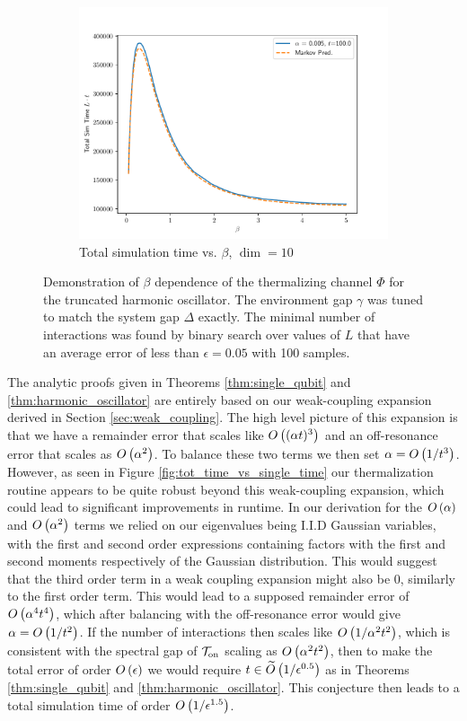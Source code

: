 \begin{figure}[t]
\begin{subfigure}{0.5\textwidth}
    \includegraphics[width=\textwidth]{tsp_numerics/data/sho_total_time_vs_beta_dim_10.pdf}
    \caption{Total simulation time vs. $\beta$, $\dim = 10$}
    \label{fig:sho_l_vs_beta_dim_10}
    \end{subfigure}
    \caption{Demonstration of $\beta$ dependence of the thermalizing channel $\Phi$ for the truncated harmonic oscillator. The environment gap $\gamma$ was tuned to match the system gap $\Delta$ exactly. The minimal number of interactions was found by binary search over values of $L$ that have an average error of less than $\epsilon = 0.05$ with 100 samples.}
    \label{fig:sho_total_time_vs_beta}
\end{figure}

The analytic proofs given in Theorems \ref{thm:single_qubit} and \ref{thm:harmonic_oscillator} are entirely based on our weak-coupling expansion derived in Section \ref{sec:weak_coupling}. The high level picture of this expansion is that we have a remainder error that scales like $O\left( (\alpha t)^3 \right)$ and an off-resonance error that scales as $O\left( \alpha^2 \right)$. To balance these two terms we then set $\alpha = O\left( 1/t^3 \right)$. However, as seen in Figure \ref{fig:tot_time_vs_single_time} our thermalization routine appears to be quite robust beyond this weak-coupling expansion, which could lead to significant improvements in runtime. In our derivation for the $O\left( \alpha \right)$ and $O\left( \alpha^2 \right)$ terms we relied on our eigenvalues being I.I.D Gaussian variables, with the first and second order expressions containing factors with the first and second moments respectively of the Gaussian distribution. This would suggest that the third order term in a weak coupling expansion might also be 0, similarly to the first order term. This would lead to a supposed remainder error of $O\left( \alpha^4 t^4 \right)$, which after balancing with the off-resonance error would give $\alpha = O\left( 1/t^2 \right)$. If the number of interactions then scales like $O\left( 1/\alpha^2 t^2 \right)$, which is consistent with the spectral gap of $\mathcal{T}_{\rm on}$ scaling as $O\left( \alpha^2 t^2 \right)$, then to make the total error of order $O\left( \epsilon \right)$ we would require $t \in \widetilde{O} \left( 1/\epsilon^{0.5} \right)$ as in Theorems \ref{thm:single_qubit} and \ref{thm:harmonic_oscillator}. This conjecture then leads to a total simulation time of order $O\left( 1/\epsilon^{1.5} \right)$. 

